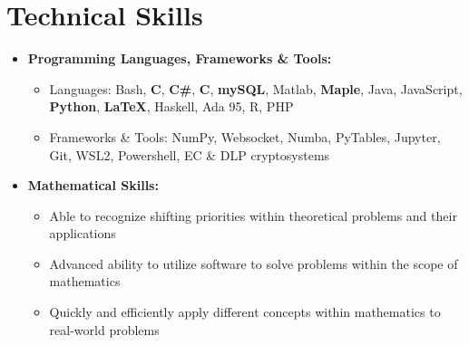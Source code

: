\documentclass[10pt,letterpaper,sans]{moderncv}
\renewcommand{\_}{\textscale{.7}{\textunderscore}}
\newcommand{\Rplus}{\protect\hspace{-.1em}\protect\raisebox{.35ex}{\smaller{\smaller\textbf{+}}}}
\newcommand{\Cpp}{\mbox{C\Rplus\Rplus}\xspace}
\begin{document}
\section{Technical Skills}
\vspace{0.75em}
\begin{itemize}
\item \textbf{Programming Languages, Frameworks \& Tools:}
\begin{itemize}
    \item {Languages:} Bash, \textbf{C}, \textbf{C\#}, \textbf{\Cpp}, \textbf{mySQL}, Matlab, \textbf{Maple}, Java, JavaScript, \textbf{Python}, \textbf{\LaTeX}, Haskell, Ada 95, R, PHP
    \item {Frameworks \& Tools:} NumPy, Websocket, Numba, PyTables, Jupyter, Git, WSL2, Powershell, EC \& DLP cryptosystems
\end{itemize}
\vspace{0.5em}
\item \textbf{Mathematical Skills:}
\begin{itemize}
    \item Able to recognize shifting priorities within theoretical problems and their applications
    \item Advanced ability to utilize software to solve problems within the scope of mathematics
    \item Quickly and efficiently apply different concepts within mathematics to real-world problems
\end{itemize}
\end{itemize}
\vspace{0.5em}

\end{document}
